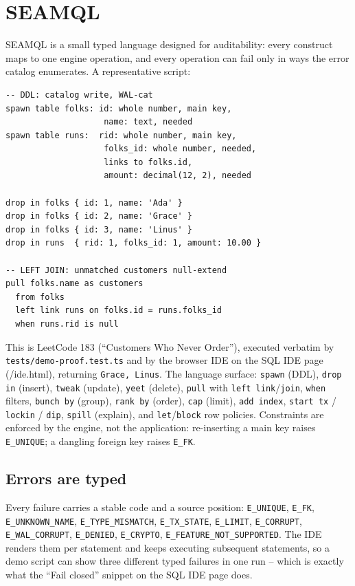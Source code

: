 \documentclass[11pt]{article}
\newcommand{\seamql}{\lstinline[language=SEAMQL]}
\newcommand{\code}[1]{\texttt{#1}}
\begin{document}
\section{SEAMQL}
\label{sec:seamql}

SEAMQL is a small typed language designed for auditability: every construct
maps to one engine operation, and every operation can fail only in ways the
error catalog enumerates. A representative script:

\begin{lstlisting}
-- DDL: catalog write, WAL-cat
spawn table folks: id: whole number, main key,
                    name: text, needed
spawn table runs:  rid: whole number, main key,
                    folks_id: whole number, needed,
                    links to folks.id,
                    amount: decimal(12, 2), needed

drop in folks { id: 1, name: 'Ada' }
drop in folks { id: 2, name: 'Grace' }
drop in folks { id: 3, name: 'Linus' }
drop in runs  { rid: 1, folks_id: 1, amount: 10.00 }

-- LEFT JOIN: unmatched customers null-extend
pull folks.name as customers
  from folks
  left link runs on folks.id = runs.folks_id
  when runs.rid is null
\end{lstlisting}

This is LeetCode 183 (``Customers Who Never Order''), executed verbatim by
\code{tests/demo-proof.test.ts} and by the browser IDE on the SQL IDE page
(/ide.html), returning \code{Grace, Linus}. The language surface: \seamql{spawn} (DDL),
\seamql{drop in} (insert), \seamql{tweak} (update), \seamql{yeet} (delete),
\seamql{pull} with \seamql{left link}/\seamql{join}, \seamql{when} filters,
\seamql{bunch by} (group), \seamql{rank by} (order), \seamql{cap} (limit),
\seamql{add index}, \seamql{start tx} / \seamql{lockin} / \seamql{dip},
\seamql{spill} (explain), and \seamql{let}/\seamql{block} row policies.
Constraints are enforced by the engine, not the application: re-inserting a
main key raises \code{E\_UNIQUE}; a dangling foreign key raises \code{E\_FK}.

\subsection{Errors are typed}
Every failure carries a stable code and a source position: \code{E\_UNIQUE},
\code{E\_FK}, \code{E\_UNKNOWN\_NAME}, \code{E\_TYPE\_MISMATCH},
\code{E\_TX\_STATE}, \code{E\_LIMIT}, \code{E\_CORRUPT},
\code{E\_WAL\_CORRUPT}, \code{E\_DENIED}, \code{E\_CRYPTO},
\code{E\_FEATURE\_NOT\_SUPPORTED}. The IDE renders them per statement and
keeps executing subsequent statements, so a demo script can show three
different typed failures in one run -- which is exactly what the ``Fail
closed'' snippet on the SQL IDE page does.
\end{document}
